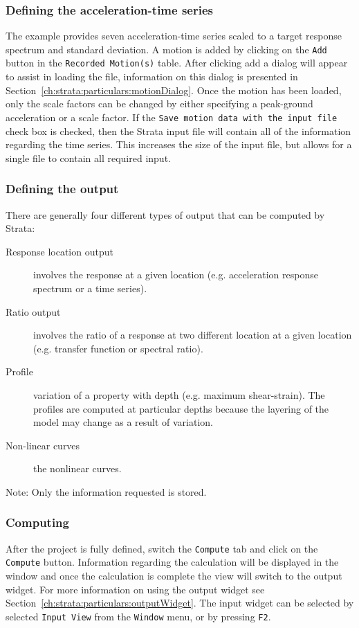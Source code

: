 \documentclass[12pt,oneside]{book}
\begin{document}
\subsubsection{Defining the acceleration-time series}
The example provides seven acceleration-time series scaled to a target response spectrum and
standard deviation.  A motion is added by clicking on the \texttt{Add} button in the
\texttt{Recorded Motion(s)} table.  After clicking add a dialog will appear to assist in loading the
file, information on this dialog is presented in Section~\ref{ch:strata:particulars:motionDialog}.
Once the motion has been loaded, only the scale factors can be changed by either specifying a
peak-ground acceleration or a scale factor.  If the \texttt{Save motion data with the input file}
check box is checked, then the Strata input file will contain all of the information regarding the
time series.  This increases the size of the input file, but allows for a single file to contain all
required input.

\subsubsection{Defining the output}
There are generally four different types of output that can be computed by Strata:
\begin{description}
    \item[Response location output] involves the response at a given location (e.g. acceleration
        response spectrum or a time series).
    \item[Ratio output] involves the ratio of a response at two different location at a given location
        (e.g. transfer function or spectral ratio).
    \item[Profile] variation of a property with depth (e.g. maximum shear-strain).  The profiles are
        computed at particular depths because the layering of the model may change as a result of variation. 
    \item[Non-linear curves] the nonlinear curves.
\end{description}

Note: Only the information requested is stored.

\subsubsection{Computing}
After the project is fully defined, switch the \texttt{Compute} tab and click on the
\texttt{Compute} button.  Information regarding the calculation will be displayed in the window and
once the calculation is complete the view will switch to the output widget.  For more information
on using the output widget see Section~\ref{ch:strata:particulars:outputWidget}.  The input widget
can be selected by selected \texttt{Input View} from the \texttt{Window} menu, or by pressing
\texttt{F2}.
\end{document}
